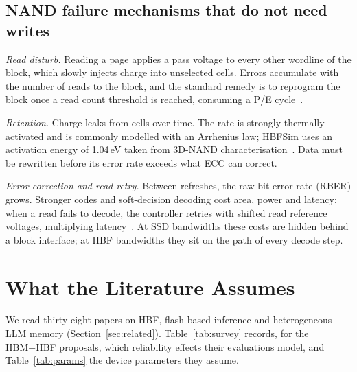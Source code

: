\documentclass[conference,10pt]{IEEEtran}
\begin{document}
\subsection{NAND failure mechanisms that do not need writes}
\textit{Read disturb.} Reading a page applies a pass voltage to every other
wordline of the block, which slowly injects charge into unselected cells. Errors
accumulate with the number of reads to the block, and the standard remedy is to
reprogram the block once a read count threshold is reached, consuming a P/E
cycle~\cite{cai2015readdisturb}.

\textit{Retention.} Charge leaks from cells over time. The rate is strongly
thermally activated and is commonly modelled with an Arrhenius law; HBFSim uses
an activation energy of 1.04\,eV taken from 3D-NAND
characterisation~\cite{hu2026hbfsim,luo2018heatwatch}. Data must be rewritten
before its error rate exceeds what ECC can correct.

\textit{Error correction and read retry.} Between refreshes, the raw bit-error
rate (RBER) grows. Stronger codes and soft-decision decoding cost area, power and
latency; when a read fails to decode, the controller retries with shifted read
reference voltages, multiplying latency~\cite{cai2017errors}. At SSD bandwidths
these costs are hidden behind a block interface; at HBF bandwidths they sit on
the path of every decode step.

\section{What the Literature Assumes}
\label{sec:gaps}

We read thirty-eight papers on HBF, flash-based inference and heterogeneous LLM
memory (Section~\ref{sec:related}). Table~\ref{tab:survey} records, for the HBM+HBF
proposals, which reliability effects their evaluations model, and
Table~\ref{tab:params} the device parameters they assume.
\end{document}
